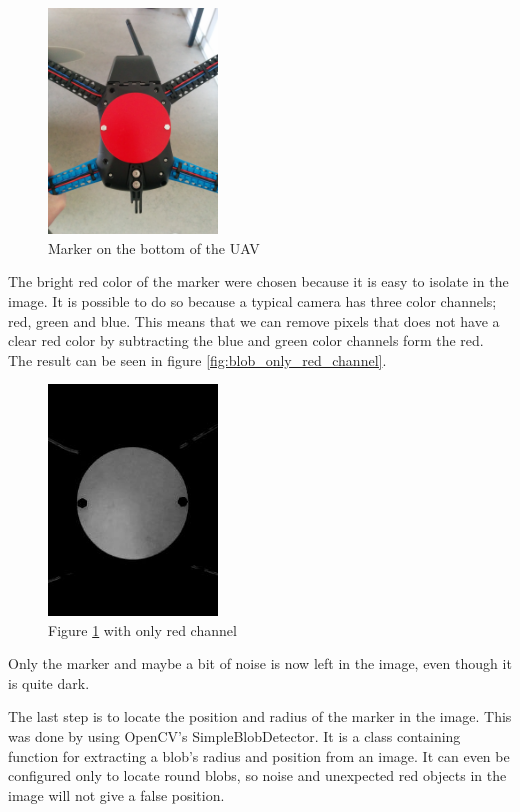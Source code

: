 \begin{figure}
	\centering
	\includegraphics[width=0.4\textwidth, trim=15cm 15cm 12cm 23cm, clip=true]{imgs/blob_example}
	\caption{Marker on the bottom of the UAV}
	\label{fig:blob_example}
\end{figure}
The bright red color of the marker were chosen because it is easy to isolate in the image. It is possible to do so because a typical camera has three color channels; red, green and blue. This means that we can remove pixels that does not have a clear red color by subtracting the blue and green color channels form the red. The result can be seen in figure \vref{fig:blob_only_red_channel}.

\begin{figure}
	\centering
	\includegraphics[width=0.4\textwidth]{imgs/blob_only_red_channel}
	\caption{Figure \ref{fig:blob_example} with only red channel}
	\label{fig:blob_only_red_channel}
\end{figure}

Only the marker and maybe a bit of noise is now left in the image, even though it is quite dark. 

The last step is to locate the position and radius of the marker in the image. This was done by using OpenCV's SimpleBlobDetector. It is a class containing function for extracting a blob's radius and position from an image. It can even be configured only to locate round blobs, so noise and unexpected red objects in the image will not give a false position.

